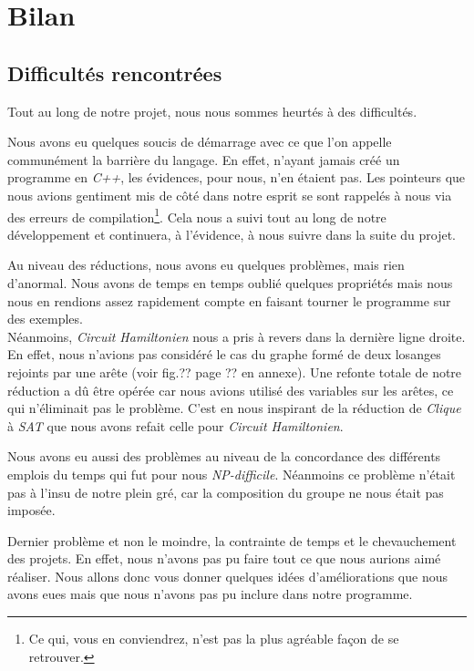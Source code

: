  \section{Bilan}
 
  \subsection{Difficultés rencontrées}
  Tout au long de notre projet, nous nous sommes heurtés à des
  difficultés.

  Nous avons eu quelques soucis de démarrage avec ce que l'on appelle
  communément la barrière du langage. En effet, n'ayant jamais créé un
  programme en \emph{C++}, les évidences, pour nous, n'en étaient
  pas. Les pointeurs que nous avions gentiment mis de côté dans notre
  esprit se sont rappelés à nous via des erreurs de
  compilation\footnote{Ce qui, vous en conviendrez, n'est pas la plus
  agréable façon de se retrouver.}. Cela nous a suivi tout au long de
  notre développement et continuera, à l'évidence, à nous suivre dans la
  suite du projet. 

  Au niveau des réductions, nous avons eu quelques problèmes, mais rien
  d'anormal. Nous avons de temps en temps oublié quelques propriétés
  mais nous nous en rendions assez rapidement compte en faisant tourner
  le programme sur des exemples.\\
  Néanmoins, \emph{Circuit Hamiltonien} nous a pris à revers dans la
  dernière ligne droite. En effet, nous n'avions pas considéré le cas du
  graphe formé de deux losanges rejoints par une arête (voir fig.?? page
  ?? en annexe). Une refonte totale de notre réduction a dû être opérée
  car nous avions utilisé des variables sur les arêtes, ce qui
  n'éliminait pas le problème. C'est en nous inspirant de la réduction
  de \emph{Clique} à \emph{SAT} que nous avons refait celle pour
  \emph{Circuit Hamiltonien}.

  Nous avons eu aussi des problèmes au niveau de la concordance des
  différents emplois du temps qui fut pour nous
  \emph{NP-difficile}. Néanmoins ce problème n'était pas à l'insu de
  notre plein gré, car la composition du groupe ne nous était pas
  imposée.

  Dernier problème et non le moindre, la contrainte de temps et le
  chevauchement des projets. En effet, nous n'avons pas pu faire tout ce
  que nous aurions aimé réaliser. Nous allons donc vous donner quelques
  idées d'améliorations que nous avons eues mais que nous n'avons pas pu
  inclure dans notre programme.
  
